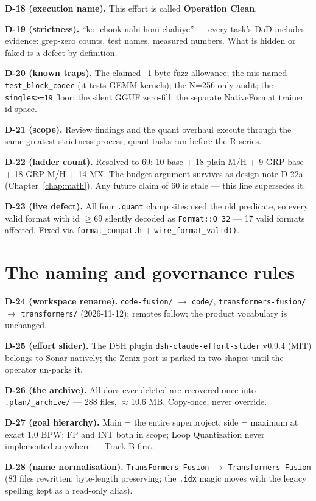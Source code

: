 \textbf{D-18 (execution name).} This effort is called \textbf{Operation Clean}.

\textbf{D-19 (strictness).} ``koi chook nahi honi chahiye'' --- every task's DoD includes
evidence: grep-zero counts, test names, measured numbers. What is hidden or faked is a defect
by definition.

\textbf{D-20 (known traps).} The claimed+1-byte fuzz allowance; the mis-named
\texttt{test\_block\_codec} (it tests GEMM kernels); the N=256-only audit; the
\texttt{singles>=19} floor; the silent GGUF zero-fill; the separate NativeFormat trainer
id-space.

\textbf{D-21 (scope).} Review findings and the quant overhaul execute through the same
greatest-strictness process; quant tasks run before the R-series.

\textbf{D-22 (ladder count).} Resolved to 69: 10 base + 18 plain M/H + 9 GRP base + 18 GRP M/H
+ 14 MX. The budget argument survives as design note D-22a (Chapter~\ref{chap:math}). Any
future claim of 60 is stale --- this line supersedes it.

\textbf{D-23 (live defect).} All four \texttt{.quant} clamp sites used the old predicate, so
every valid format with id $\ge 69$ silently decoded as \texttt{Format::Q\_32} --- 17 valid
formats affected. Fixed via \texttt{format\_compat.h} + \texttt{wire\_format\_valid()}.

\section{The naming and governance rules}

\textbf{D-24 (workspace rename).} \texttt{code-fusion/} $\to$ \texttt{code/},
\texttt{transformers-fusion/} $\to$ \texttt{transformers/} (2026-11-12); remotes follow; the
product vocabulary is unchanged.

\textbf{D-25 (effort slider).} The DSH plugin \texttt{dsh-claude-effort-slider} v0.9.4 (MIT)
belongs to Sonar natively; the Zenix port is parked in two shapes until the operator un-parks
it.

\textbf{D-26 (the archive).} All docs ever deleted are recovered once into
\texttt{.plan/\_archive/} --- 288 files, $\approx$10.6 MB. Copy-once, never override.

\textbf{D-27 (goal hierarchy).} Main = the entire superproject; side = maximum at exact 1.0
BPW; FP and INT both in scope; Loop Quantization never implemented anywhere --- Track B first.

\textbf{D-28 (name normalisation).} \texttt{TransFormers-Fusion} $\to$
\texttt{Transformers-Fusion} (83 files rewritten; byte-length preserving; the \texttt{.idx}
magic moves with the legacy spelling kept as a read-only alias).

